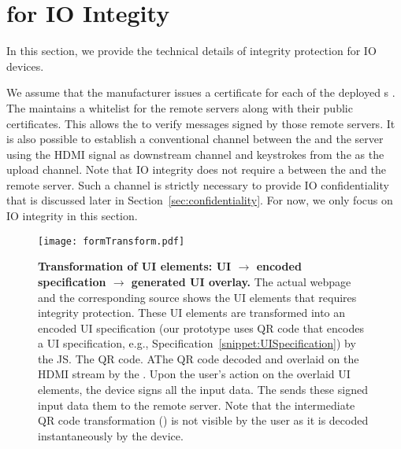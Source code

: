 \section{\name for IO Integity}
\label{sec:systemDesign}


In this section, we provide the technical details of \name integrity protection for IO devices. 

 We assume that the \device manufacturer issues a certificate for each of the deployed \device{}s . The \device maintains a whitelist for the remote servers along with their public certificates. This allows the \device to verify messages signed by those remote servers. It is also possible to establish a conventional \tls channel between the \device and the server using the HDMI signal as downstream channel and keystrokes from the \device as the upload channel. Note that IO integrity does not require a \tls between the \device and the remote server. Such a \tls channel is strictly necessary to provide IO confidentiality that is discussed later in Section~\ref{sec:confidentiality}.  For now, we only focus on IO integrity in this section.


\begin{figure*}[t]
\centering
\texttt{[image: formTransform.pdf]}
\caption{\textbf{Transformation of UI elements: UI $\rightarrow$ encoded specification $\rightarrow$ \device generated UI overlay.} \one The actual webpage and the corresponding \html source shows the UI elements that requires integrity protection. \two These UI elements are transformed into an encoded UI specification (our \name prototype uses QR code that encodes a UI specification, e.g., Specification~\ref{snippet:UISpecification}) by the \name JS. The QR code. \three AThe QR code decoded and overlaid on the HDMI stream by the \device. \four Upon the user's action on the overlaid UI elements, the device signs all the input data. \five The \device sends these signed input data them to the remote server. Note that the intermediate QR code transformation (\two) is not visible by the user as it is decoded instantaneously by the device.}
\spacesave
\label{fig:transformation}
\end{figure*}


